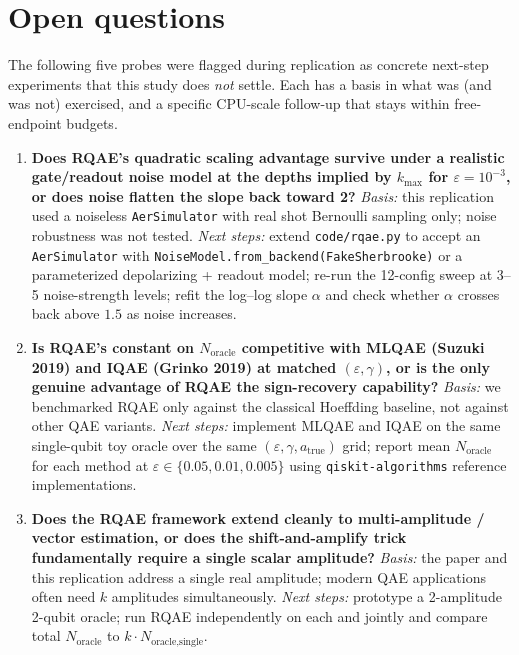 \section{Open questions}

The following five probes were flagged during replication as concrete
next-step experiments that this study does \emph{not} settle. Each has a
basis in what was (and was not) exercised, and a specific CPU-scale
follow-up that stays within free-endpoint budgets.

\begin{enumerate}

\item \textbf{Does RQAE's quadratic scaling advantage survive under a
realistic gate/readout noise model at the depths implied by $k_{\max}$
for $\varepsilon = 10^{-3}$, or does noise flatten the slope back toward 2?}
\emph{Basis:} this replication used a noiseless \texttt{AerSimulator}
with real shot Bernoulli sampling only; noise robustness was not tested.
\emph{Next steps:} extend \texttt{code/rqae.py} to accept an
\texttt{AerSimulator} with \texttt{NoiseModel.from\_backend(FakeSherbrooke)}
or a parameterized depolarizing + readout model; re-run the 12-config sweep
at 3--5 noise-strength levels; refit the log--log slope $\alpha$ and check
whether $\alpha$ crosses back above $1.5$ as noise increases.

\item \textbf{Is RQAE's constant on $N_{\text{oracle}}$ competitive with
MLQAE (Suzuki 2019) and IQAE (Grinko 2019) at matched
$(\varepsilon, \gamma)$, or is the only genuine advantage of RQAE the
sign-recovery capability?} \emph{Basis:} we benchmarked RQAE only against
the classical Hoeffding baseline, not against other QAE variants.
\emph{Next steps:} implement MLQAE and IQAE on the same single-qubit toy
oracle over the same $(\varepsilon, \gamma, a_{\text{true}})$ grid; report
mean $N_{\text{oracle}}$ for each method at $\varepsilon \in \{0.05, 0.01, 0.005\}$
using \texttt{qiskit-algorithms} reference implementations.

\item \textbf{Does the RQAE framework extend cleanly to multi-amplitude /
vector estimation, or does the shift-and-amplify trick fundamentally
require a single scalar amplitude?} \emph{Basis:} the paper and this
replication address a single real amplitude; modern QAE applications often
need $k$ amplitudes simultaneously. \emph{Next steps:} prototype a
2-amplitude 2-qubit oracle; run RQAE independently on each and jointly and
compare total $N_{\text{oracle}}$ to $k \cdot N_{\text{oracle,single}}$.


\end{enumerate}

